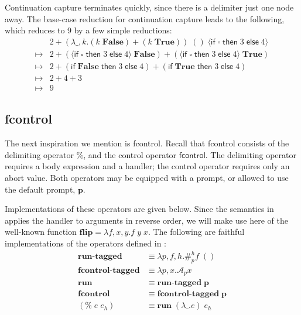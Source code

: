 \documentclass[11pt]{article}
\newcommand{\maybePage}{\null}
\newcommand\A{\mathcal{A}}
\newcommand{\angles}[1]{\langle#1\rangle}
\begin{document}
\newpage %
Continuation capture terminates quickly, since there is a delimiter just one node away.
The base-case reduction for continuation capture leads to the following, which reduces to 9 by a few simple reductions:
\begin{align*}
& 2 +
	(\lambda \_,k. (k\;\mathbf{False}) + (k\;\mathbf{True}))
	\;()
	\;\angles{\mathsf{if}\;\square\;\mathsf{then}\;3\;\mathsf{else}\;4} \\
\mapsto{} & 2 +
	(\angles{\mathsf{if}\;\square\;\mathsf{then}\;3\;\mathsf{else}\;4}\;\mathbf{False})
	+ (\angles{\mathsf{if}\;\square\;\mathsf{then}\;3\;\mathsf{else}\;4}\;\mathbf{True}) \\
\mapsto{} & 2 + (\mathsf{if}\;\mathbf{False}\;\mathsf{then}\;3\;\mathsf{else}\;4) + (\mathsf{if}\;\mathbf{True}\;\mathsf{then}\;3\;\mathsf{else}\;4) \\
\mapsto{} & 2 + 4 + 3 \\
\mapsto{} & 9
\end{align*}


\maybePage
\subsection{fcontrol}

The next inspiration we mention is fcontrol.
Recall that fcontrol consists of the delimiting operator $\%$, and the control operator $\mathsf{fcontrol}$.
The delimiting operator requires a body expression and a handler; the control operator requires only an abort value.
Both operators may be equipped with a prompt, or allowed to use the default prompt, $\mathbf{p}$.

Implementations of these operators are given below.
Since the semantics in \cite{HandlingControl} applies the handler to arguments in reverse order, we will make use here of the well-known function $\mathbf{flip} = \lambda f,x,y. f\;y\;x$.
The following are faithful implementations of the operators defined in \cite{HandlingControl}:
\begin{align*}
\textbf{run-tagged} &\equiv \lambda p,f,h. \#_p^h f\;() \\
\textbf{fcontrol-tagged} &\equiv \lambda p,x. \A_p x \\
\textbf{run} &\equiv \textbf{run-tagged}\;\mathbf{p} \\
\mathbf{fcontrol} &\equiv \textbf{fcontrol-tagged}\;\mathbf{p} \\
(\%\;e\;e_h) &\equiv \textbf{run}\;(\lambda \_.e)\;e_h \\
\end{align*}
\end{document}
